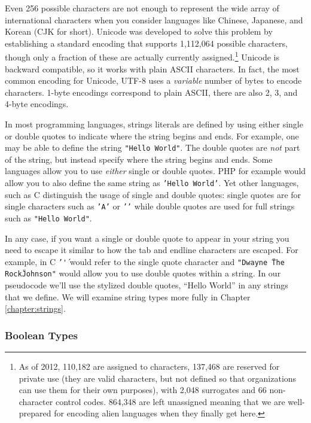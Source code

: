 Even 256 possible characters are not enough to represent the wide array of international
characters when you consider languages like Chinese, Japanese, and Korean (CJK for short).
Unicode was developed to solve this problem by establishing a standard encoding
that supports 1,112,064 possible characters, though only a fraction of these are actually
currently assigned.\footnote{As of 2012, 110,182 are assigned to characters, 137,468 are 
reserved for private use (they are valid characters, but not defined so that organizations can
use them for their own purposes), with 2,048 surrogates and 66 non-character control 
codes.  864,348 are left unassigned meaning that we are well-prepared for encoding
alien languages when they finally get here.}  Unicode is \gls{backward compatible}, so
it works with plain ASCII characters.  In fact, the most common encoding for Unicode, UTF-8 
uses a \emph{variable} number of bytes to encode characters.  1-byte encodings correspond
to plain ASCII, there are also 2, 3, and 4-byte encodings.

In most programming languages, strings \glspl{literal} are defined by 
using either single or double quotes to indicate where the string begins 
and ends.  For example, one may be able to define the string 
\texttt{"Hello World"}.  The double quotes are \emph{not}
part of the string, but instead specify where the string begins and ends.  Some languages
allow you to use \emph{either} single or double quotes.  PHP for example would allow you
to also define the same string as \texttt{'Hello World'}.  Yet other languages, such 
as C distinguish the usage of single and double quotes: single quotes are for single characters
such as \texttt{'A'} or \texttt{'\n'} while double quotes are used for full 
strings such as \texttt{"Hello World"}.

In any case, if you want a single or double quote to appear in your string you need to
escape it similar to how the tab and endline characters are escaped.  For example, in C 
\texttt{'\''} would refer to the single quote character and 
\texttt{"Dwayne \"The Rock\" Johnson"} would allow you to use double quotes
within a string.  In our pseudocode we'll use the stylized double quotes, ``Hello World'' 
in any strings that we define.  We will examine string types more fully in Chapter \ref{chapter:strings}.

\subsubsection{Boolean Types}

